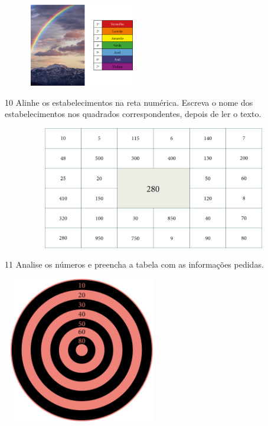 \includegraphics[width=2.71875in,height=1.42734in]{media/image21.png}


\num{10} Alinhe os estabelecimentos na reta numérica. Escreva o nome dos
estabelecimentos nos quadrados correspondentes, depois de ler o texto.


\includegraphics[width=6.36364in,height=2.11458in]{media/image22.png}


\num{11} Analise os números e preencha a tabela com as informações pedidas.


\includegraphics[width=2.72103in,height=2.51437in]{media/image23.png}


